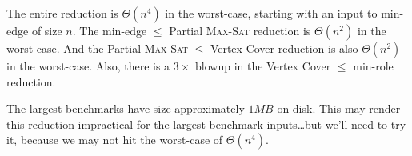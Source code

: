\documentclass[11pt,onecolumn]{article}
\begin{document}
\vspace*{0.125in}
\noindent
The entire reduction is $\Theta(n^4)$ in the worst-case, starting with an input to min-edge of size $n$. The min-edge $\le$ Partial \textsc{Max-Sat} reduction is $\Theta(n^2)$ in the worst-case. And the Partial \textsc{Max-Sat} $\le$ Vertex Cover reduction is also $\Theta(n^2)$ in the worst-case. Also, there is a $3\times$ blowup in the Vertex Cover $\le$ min-role reduction.

\vspace*{0.125in}
\noindent
The largest benchmarks have size approximately $1 MB$ on disk. This may render this reduction impractical for the largest benchmark inputs\ldots but we'll need to try it, because we may not hit the worst-case of $\Theta(n^4)$.
\end{document}
